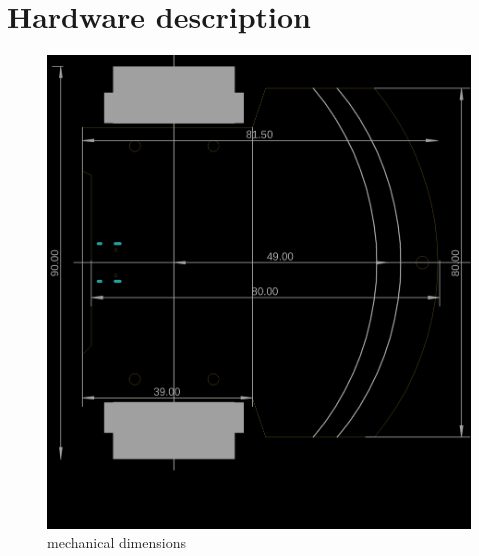 \documentclass[12pt,twoside,onecolumn,openany,extrafontsizes,dvipsnames]{memoir}
\title{\booktitle}
\author{\authorname}
\begin{document}
\chapter{Hardware description}


\newpage
\begin{figure}[htb]
    \centering
    \includegraphics[scale=0.4]{../images/board_dims.png}
    \caption{mechanical dimensions}
\end{figure}
\end{document}
